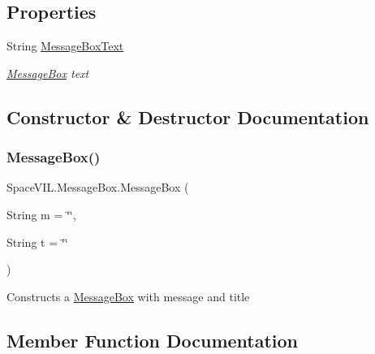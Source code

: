 \subsection*{Properties}
\begin{DoxyCompactItemize}
\item 
String \mbox{\hyperlink{class_space_v_i_l_1_1_message_box_a17b1d957b5a8835a4dc60b0e59067ab0}{Message\+Box\+Text}}
\begin{DoxyCompactList}\small\item\em \mbox{\hyperlink{class_space_v_i_l_1_1_message_box}{Message\+Box}} text \end{DoxyCompactList}\end{DoxyCompactItemize}


\subsection{Constructor \& Destructor Documentation}
\mbox{\label{class_space_v_i_l_1_1_message_box_a127851c5ef0b92c55134c37820b5e459}} 
\subsubsection{\texorpdfstring{Message\+Box()}{MessageBox()}}
{\footnotesize\ttfamily Space\+V\+I\+L.\+Message\+Box.\+Message\+Box (\begin{DoxyParamCaption}\item[{String}]{m = {\ttfamily \char`\"{}\char`\"{}},  }\item[{String}]{t = {\ttfamily \char`\"{}\char`\"{}} }\end{DoxyParamCaption})\hspace{0.3cm}{\ttfamily [inline]}}



Constructs a \mbox{\hyperlink{class_space_v_i_l_1_1_message_box}{Message\+Box}} with message and title 



\subsection{Member Function Documentation}
\mbox{\label{class_space_v_i_l_1_1_message_box_ac14ecd2643e043c578ef4cf568887daf}} 
